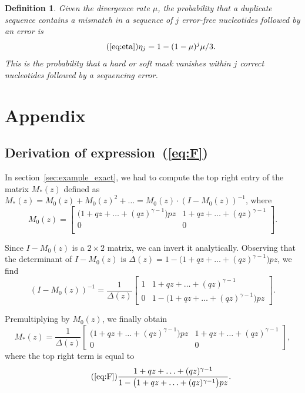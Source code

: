 \documentclass{article}
\newtheorem{definition}{Definition}
\begin{document}
\begin{definition}
Given the divergence rate $\mu$, the probability that a duplicate sequence
contains a mismatch in a sequence of $j$ error-free nucleotides followed
by an error is
\begin{equation}
\tag{\ref{eq:eta}}
\eta_j = 1-(1-\mu)^j\mu/3.
\end{equation}
This is the probability that a hard or soft mask vanishes within $j$
correct nucleotides followed by a sequencing error.
\end{definition}

\section{Appendix}
\subsection{Derivation of expression~(\ref{eq:F})}
\label{app_ex1}

In section~\ref{sec:example_exact}, we had to compute the top right entry
of the matrix $M_*(z)$ defined as $M_*(z) = M_0(z) + M_0(z)^2 + \ldots =
M_0(z) \cdot (I-M_0(z))^{-1}$, where
\begin{equation*}
M_0(z) =
\begin{bmatrix}
\big( 1+qz+\ldots+(qz)^{\gamma-1}
\big) pz  & 1+qz+\ldots+(qz)^{\gamma-1} \\
0 & 0 \\
\end{bmatrix}.
\end{equation*}

Since $I-M_0(z)$ is a $2\times2$ matrix, we can invert it analytically.
Observing that the determinant of $I-M_0(z)$ is $\Delta(z) = 1-\big(
1+qz+\ldots+(qz)^{\gamma-1}\big) pz$, we find
\begin{equation*}
(I-M_0(z))^{-1} = \frac{1}{\Delta(z)}
\begin{bmatrix}
1 & 1+qz+\ldots+(qz)^{\gamma-1} \\
0 & 1-\big( 1+qz+\ldots+(qz)^{\gamma-1} \big) pz
\end{bmatrix}.
\end{equation*}

Premultiplying by $M_0(z)$, we finally obtain
\begin{equation*}
M_*(z) = \frac{1}{\Delta(z)}
\begin{bmatrix}
\big( 1+qz+\ldots+(qz)^{\gamma-1} \big) pz &
1+qz+\ldots+(qz)^{\gamma-1} \\
0 & 0 \end{bmatrix},
\end{equation*}
where the top right term is equal to
\begin{equation}
\tag{\ref{eq:F}}
\frac{1+qz+\ldots+(qz)^{\gamma-1}}
{1-\big( 1+qz+\ldots+(qz)^{\gamma-1} \big) pz}.
\end{equation}
\end{document}
